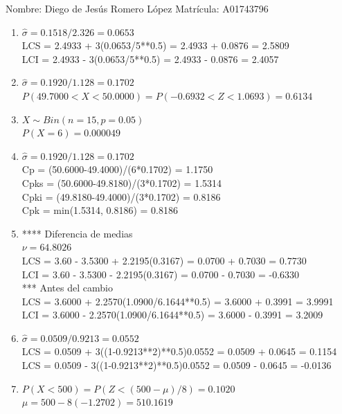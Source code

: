 \documentclass[8pt]{report}
\begin{document}
 \newpage

Nombre: \underline{\hspace*{.2in}}
Diego de Jesús Romero López
\underline{\hspace*{.2in}} \quad Matr\'icula:\underline{\hspace*{.2in}}
A01743796
\underline{\hspace*{.2in}} \\

\begin{enumerate}
\item $\hat\sigma = 0.1518/2.326 = 0.0653$\\
LCS = 2.4933 + 3(0.0653/5**0.5) = 2.4933 + 0.0876 = 2.5809\\
LCI = 2.4933 - 3(0.0653/5**0.5) = 2.4933 - 0.0876 = 2.4057
\item $\hat\sigma = 0.1920/1.128 = 0.1702$\\
$P(49.7000 < X < 50.0000) = P(-0.6932 < Z < 1.0693) = 0.6134$\\
\item $X \sim Bin(n=15, p=0.05)$\\
$P(X = 6) = 0.000049$
\item $\hat\sigma = 0.1920/1.128 = 0.1702$\\
Cp = (50.6000-49.4000)/(6*0.1702) = 1.1750\\
Cpks = (50.6000-49.8180)/(3*0.1702) = 1.5314\\
Cpki = (49.8180-49.4000)/(3*0.1702) = 0.8186\\
Cpk = min(1.5314, 0.8186) = 0.8186
\item **** Diferencia de medias\\
$\nu = 64.8026$\\
LCS = 3.60 - 3.5300 + 2.2195(0.3167) = 0.0700 + 0.7030 = 0.7730\\
LCI = 3.60 - 3.5300 - 2.2195(0.3167) = 0.0700 - 0.7030 = -0.6330\\
*** Antes del cambio\\
LCS = 3.6000 + 2.2570(1.0900/6.1644**0.5) = 3.6000 + 0.3991 = 3.9991\\
LCI = 3.6000 - 2.2570(1.0900/6.1644**0.5) = 3.6000 - 0.3991 = 3.2009\\
\item $\hat\sigma = 0.0509/0.9213 = 0.0552$\\
LCS = 0.0509 + 3((1-0.9213**2)**0.5)0.0552 = 0.0509 + 0.0645 = 0.1154\\
LCS = 0.0509 - 3((1-0.9213**2)**0.5)0.0552 = 0.0509 - 0.0645 = -0.0136
\item $P(X < 500) = P(Z < (500-\mu)/8) = 0.1020$\\
$\mu = 500 - 8(-1.2702) = 510.1619$\\
\end{enumerate}
\end{document}
